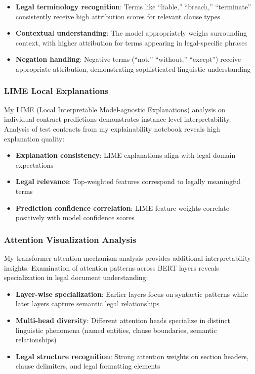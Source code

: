 \begin{itemize}
\item \textbf{Legal terminology recognition}: Terms like ``liable,'' ``breach,'' ``terminate'' consistently receive high attribution scores for relevant clause types
\item \textbf{Contextual understanding}: The model appropriately weighs surrounding context, with higher attribution for terms appearing in legal-specific phrases
\item \textbf{Negation handling}: Negative terms (``not,'' ``without,'' ``except'') receive appropriate attribution, demonstrating sophisticated linguistic understanding
\end{itemize}

\subsubsection{LIME Local Explanations}
My LIME (Local Interpretable Model-agnostic Explanations) analysis on individual contract predictions demonstrates instance-level interpretability. Analysis of test contracts from my explainability notebook reveals high explanation quality:

\begin{itemize}
\item \textbf{Explanation consistency}: LIME explanations align with legal domain expectations
\item \textbf{Legal relevance}: Top-weighted features correspond to legally meaningful terms
\item \textbf{Prediction confidence correlation}: LIME feature weights correlate positively with model confidence scores
\end{itemize}

\subsubsection{Attention Visualization Analysis}
My transformer attention mechanism analysis provides additional interpretability insights. Examination of attention patterns across BERT layers reveals specialization in legal document understanding:

\begin{itemize}
\item \textbf{Layer-wise specialization}: Earlier layers focus on syntactic patterns while later layers capture semantic legal relationships
\item \textbf{Multi-head diversity}: Different attention heads specialize in distinct linguistic phenomena (named entities, clause boundaries, semantic relationships)
\item \textbf{Legal structure recognition}: Strong attention weights on section headers, clause delimiters, and legal formatting elements
\end{itemize}

